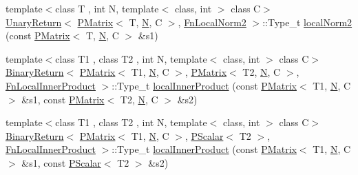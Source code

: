 \begin{DoxyCompactItemize}
{\footnotesize template$<$class T , int N, template$<$ class, int $>$ class C$>$ }\\\mbox{\hyperlink{structENSEM_1_1UnaryReturn}{Unary\+Return}}$<$ \mbox{\hyperlink{classENSEM_1_1PMatrix}{P\+Matrix}}$<$ T, \mbox{\hyperlink{operator__name__util_8cc_a7722c8ecbb62d99aee7ce68b1752f337}{N}}, C $>$, \mbox{\hyperlink{structENSEM_1_1FnLocalNorm2}{Fn\+Local\+Norm2}} $>$\+::Type\+\_\+t \mbox{\hyperlink{group__primmatrix_ga701b80e6864ced6a31a2abc314946f2f}{local\+Norm2}} (const \mbox{\hyperlink{classENSEM_1_1PMatrix}{P\+Matrix}}$<$ T, \mbox{\hyperlink{operator__name__util_8cc_a7722c8ecbb62d99aee7ce68b1752f337}{N}}, C $>$ \&s1)
\item 
{\footnotesize template$<$class T1 , class T2 , int N, template$<$ class, int $>$ class C$>$ }\\\mbox{\hyperlink{structENSEM_1_1BinaryReturn}{Binary\+Return}}$<$ \mbox{\hyperlink{classENSEM_1_1PMatrix}{P\+Matrix}}$<$ T1, \mbox{\hyperlink{operator__name__util_8cc_a7722c8ecbb62d99aee7ce68b1752f337}{N}}, C $>$, \mbox{\hyperlink{classENSEM_1_1PMatrix}{P\+Matrix}}$<$ T2, \mbox{\hyperlink{operator__name__util_8cc_a7722c8ecbb62d99aee7ce68b1752f337}{N}}, C $>$, \mbox{\hyperlink{structENSEM_1_1FnLocalInnerProduct}{Fn\+Local\+Inner\+Product}} $>$\+::Type\+\_\+t \mbox{\hyperlink{group__primmatrix_ga8ba784b1249c948dcff5b8fe086e2eb5}{local\+Inner\+Product}} (const \mbox{\hyperlink{classENSEM_1_1PMatrix}{P\+Matrix}}$<$ T1, \mbox{\hyperlink{operator__name__util_8cc_a7722c8ecbb62d99aee7ce68b1752f337}{N}}, C $>$ \&s1, const \mbox{\hyperlink{classENSEM_1_1PMatrix}{P\+Matrix}}$<$ T2, \mbox{\hyperlink{operator__name__util_8cc_a7722c8ecbb62d99aee7ce68b1752f337}{N}}, C $>$ \&s2)
\item 
{\footnotesize template$<$class T1 , class T2 , int N, template$<$ class, int $>$ class C$>$ }\\\mbox{\hyperlink{structENSEM_1_1BinaryReturn}{Binary\+Return}}$<$ \mbox{\hyperlink{classENSEM_1_1PMatrix}{P\+Matrix}}$<$ T1, \mbox{\hyperlink{operator__name__util_8cc_a7722c8ecbb62d99aee7ce68b1752f337}{N}}, C $>$, \mbox{\hyperlink{classENSEM_1_1PScalar}{P\+Scalar}}$<$ T2 $>$, \mbox{\hyperlink{structENSEM_1_1FnLocalInnerProduct}{Fn\+Local\+Inner\+Product}} $>$\+::Type\+\_\+t \mbox{\hyperlink{group__primmatrix_gafc7ce30ddacb0b13e2db237cfa268161}{local\+Inner\+Product}} (const \mbox{\hyperlink{classENSEM_1_1PMatrix}{P\+Matrix}}$<$ T1, \mbox{\hyperlink{operator__name__util_8cc_a7722c8ecbb62d99aee7ce68b1752f337}{N}}, C $>$ \&s1, const \mbox{\hyperlink{classENSEM_1_1PScalar}{P\+Scalar}}$<$ T2 $>$ \&s2)

\end{DoxyCompactItemize}
